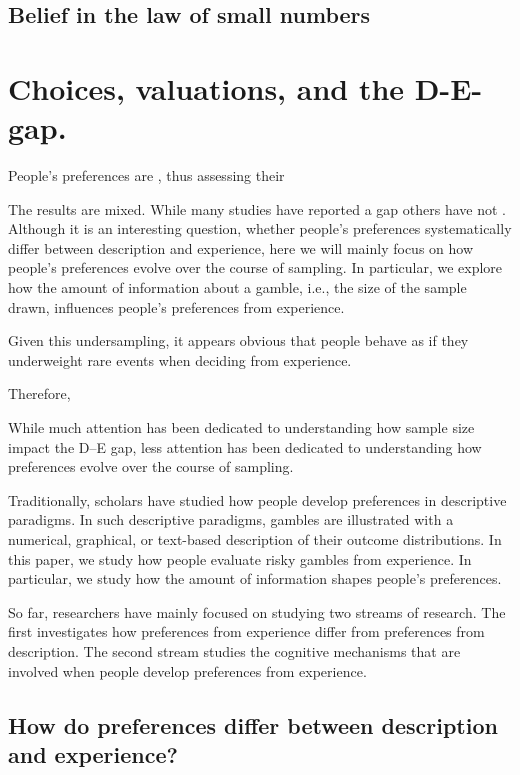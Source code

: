 \subsection{Belief in the law of small numbers}




\section{Choices, valuations, and the D-E-gap.}

People's preferences are , thus assessing their 

The results are mixed. While many studies have reported a gap \citep{Hau2008,Hau2010, Ungemach2009} others have not \citep{Camilleri2009,Camilleri2011a,Rakow2008,Kellen2016, Gloeckner2016}. Although it is an interesting question, whether people's preferences systematically differ between description and experience, here we will mainly focus on how people's preferences evolve over the course of sampling. In particular, we explore how the amount of information about a gamble, i.e., the size of the sample drawn, influences people's preferences from experience.


Given this undersampling, it appears obvious that people behave as if they underweight rare events when deciding from experience.

Therefore, 

While much attention has been dedicated to understanding how sample size impact the D--E gap, less attention has been dedicated to understanding how preferences evolve over the course of sampling. 



Traditionally, scholars have studied how people develop preferences in descriptive paradigms. In such descriptive paradigms, gambles are illustrated with a numerical, graphical, or text-based description of their outcome distributions. In this paper, we study how people evaluate risky gambles from experience. In particular, we study how the amount of information shapes people's preferences. 


So far, researchers have mainly focused on studying two streams of research. The first investigates how preferences from experience differ from preferences from description. The second stream studies the cognitive mechanisms that are involved when people develop preferences from experience. 
\subsection{How do preferences differ between description and experience?}





